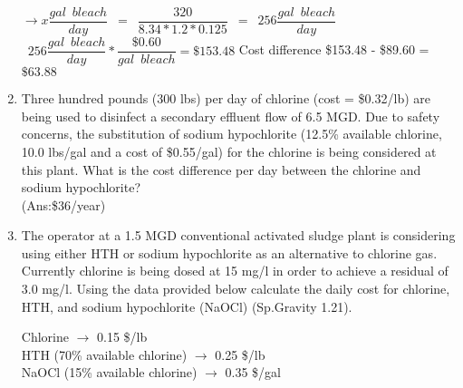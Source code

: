 \begin{enumerate}
$ \rightarrow x \dfrac{gal \enspace bleach}{day}\enspace = \enspace \dfrac{320}{8.34*1.2*0.125} \enspace = \enspace 256 \dfrac{gal \enspace bleach}{day}$\\
\vspace{0.25cm}
$\enspace 256 \dfrac{gal \enspace bleach}{day}*\dfrac{\$0.60}{gal \enspace bleach}=\$153.48$
\vspace{0.25cm}
Cost difference \$153.48 - \$89.60 = $\boxed{\$63.88}$
\vspace{0.25cm}
\item Three hundred pounds (300 lbs) per day of chlorine (cost = \$0.32/lb) are being used to  disinfect  a secondary  effluent flow of 6.5 MGD.  Due to  safety concerns, the substitution of sodium hypochlorite (12.5\% available chlorine, 10.0 lbs/gal and a cost of \$0.55/gal) for the chlorine  is being considered  at  this plant. What is the cost difference per day between the chlorine and sodium hypochlorite?\\
\vspace{0.25cm}
 (Ans:\$36/year)

\item The operator at a 1.5 MGD conventional activated sludge plant is considering using either HTH or sodium hypochlorite as an alternative to chlorine gas. Currently chlorine is being dosed at 15 mg/l in order to achieve a residual of 3.0 mg/l. Using the data provided below calculate the daily cost for chlorine, HTH, and sodium hypochlorite (NaOCl) (Sp.Gravity 1.21).
 
Chlorine $\rightarrow$ 0.15 \$/lb\\
HTH (70\% available chlorine) $\rightarrow$ 0.25 \$/lb\\
NaOCl (15\% available chlorine) $\rightarrow$ 0.35 \$/gal                                                        


\end{enumerate}
